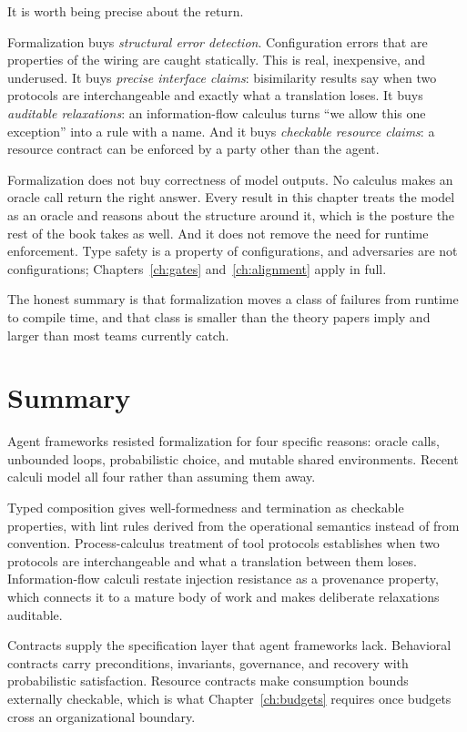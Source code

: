 \documentclass[11pt]{book}
\begin{document}
It is worth being precise about the return.

Formalization buys \textit{structural error detection}. Configuration errors that are properties of the wiring are caught statically. This is real, inexpensive, and underused. It buys \textit{precise interface claims}: bisimilarity results say when two protocols are interchangeable and exactly what a translation loses. It buys \textit{auditable relaxations}: an information-flow calculus turns ``we allow this one exception'' into a rule with a name. And it buys \textit{checkable resource claims}: a resource contract can be enforced by a party other than the agent.

Formalization does not buy correctness of model outputs. No calculus makes an oracle call return the right answer. Every result in this chapter treats the model as an oracle and reasons about the structure around it, which is the posture the rest of the book takes as well. And it does not remove the need for runtime enforcement. Type safety is a property of configurations, and adversaries are not configurations; Chapters~\ref{ch:gates} and~\ref{ch:alignment} apply in full.

The honest summary is that formalization moves a class of failures from runtime to compile time, and that class is smaller than the theory papers imply and larger than most teams currently catch.

\section{Summary}

Agent frameworks resisted formalization for four specific reasons: oracle calls, unbounded loops, probabilistic choice, and mutable shared environments. Recent calculi model all four rather than assuming them away.

Typed composition gives well-formedness and termination as checkable properties, with lint rules derived from the operational semantics instead of from convention. Process-calculus treatment of tool protocols establishes when two protocols are interchangeable and what a translation between them loses. Information-flow calculi restate injection resistance as a provenance property, which connects it to a mature body of work and makes deliberate relaxations auditable.

Contracts supply the specification layer that agent frameworks lack. Behavioral contracts carry preconditions, invariants, governance, and recovery with probabilistic satisfaction. Resource contracts make consumption bounds externally checkable, which is what Chapter~\ref{ch:budgets} requires once budgets cross an organizational boundary.
\end{document}
